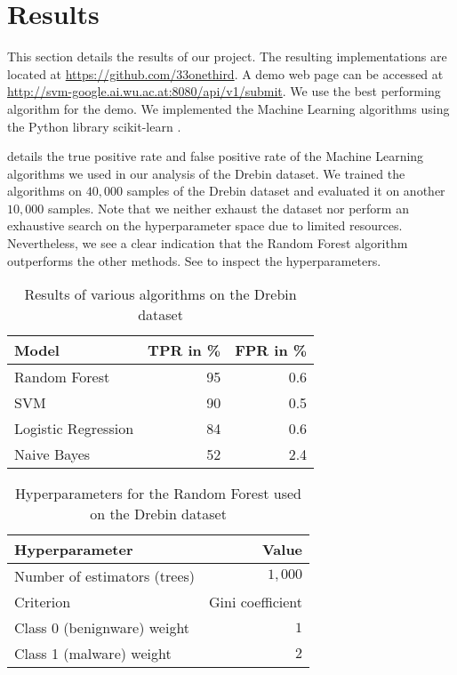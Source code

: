 \section{Results}
This section details the results of our project. The resulting implementations are located at \url{https://github.com/33onethird}. A demo web page can be accessed at \url{http://svm-google.ai.wu.ac.at:8080/api/v1/submit}. We use the best performing algorithm for the demo. We implemented the Machine Learning algorithms using the Python library scikit-learn \cite{scikit-learn}.

 details the true positive rate and false positive rate of the Machine Learning algorithms we used in our analysis of the Drebin dataset. We trained the algorithms on $40,000$ samples of the Drebin dataset and evaluated it on another $10,000$ samples. Note that we neither exhaust the dataset nor perform an exhaustive search on the hyperparameter space due to limited resources. Nevertheless, we see a clear indication that the Random Forest algorithm outperforms the other methods. See  to inspect the hyperparameters.
\begin{table}[p]
	\centering
	\begin{tabular}{l r r}
		Model & TPR in \% & FPR in \%\\
		\hline
		Random Forest & 95 & 0.6\\
		SVM & 90 & 0.5\\
		Logistic Regression & 84 & 0.6\\
		Naive Bayes & 52 & 2.4\\
		\hline
	\end{tabular}
	\caption{Results of various algorithms on the Drebin dataset}
	\label{tab:resdreb}
\end{table}

\begin{table}[p]
	\centering
	\begin{tabular}{l r}
		Hyperparameter & Value \\
		\hline
		Number of estimators (trees) & $1,000$\\
		Criterion & Gini coefficient\\
		Class 0 (benignware) weight & $1$\\
		Class 1 (malware) weight & $2$\\
		\hline
	\end{tabular}
	\caption{Hyperparameters for the Random Forest used on the Drebin dataset}
	\label{tab:rfdrebin}
\end{table}

